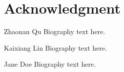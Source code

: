 \documentclass[journal]{IEEEtran}
\begin{document}

%



%




% 
\newpage

%



\appendices




\section*{Acknowledgment}



\ifCLASSOPTIONcaptionsoff
  \newpage
\fi




% 


\begin{IEEEbiography}{Zhaonan Qu}
Biography text here.
\end{IEEEbiography}

\begin{IEEEbiographynophoto}{Kaixiang Lin}
Biography text here.
\end{IEEEbiographynophoto}


\begin{IEEEbiographynophoto}{Jane Doe}
Biography text here.
\end{IEEEbiographynophoto}






\end{document}
